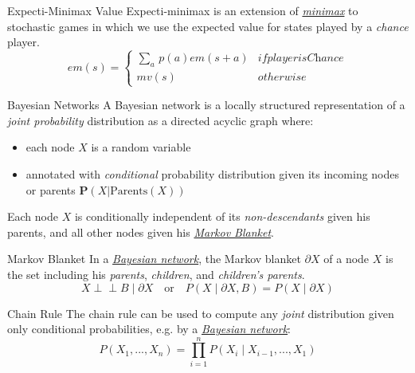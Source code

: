 \documentclass{cognito}
\begin{document}

\begin{note}{Expecti-Minimax Value}
	Expecti-minimax is an extension of \hyperref[note:Minimax Decision]{\it minimax} to stochastic games in which
	we use the expected value for states played by a \emph{chance} player.
	$$
		em(s) = \begin{cases*}
			\sum_a \, p(a) em(s + a) & if player is \textit{Chance}\\
			mv(s) & otherwise
		\end{cases*}
	$$
	\vspace{-5pt}
\end{note}

\begin{note}{Bayesian Networks}
	A Bayesian network is a locally structured representation of a \emph{joint probability} distribution
	as a directed acyclic graph where:\begin{itemize}
		\item each node $X$ is a random variable
		\item annotated with \emph{conditional} probability distribution given its incoming nodes or parents $\mathbf{P}(X|\text{Parents}(X))$
	\end{itemize}
	Each node $X$ is conditionally independent of its \emph{non-descendants} given his parents, and all other nodes
	given his \hyperref[note:Markov Blanket]{\emph{Markov Blanket}}.
	
\end{note}

\begin{note}{Markov Blanket}
	In a \hyperref[note:Bayesian Networks]{\emph{Bayesian network}}, the Markov blanket $\partial X$ of a node $X$ is the set including his \emph{parents}, \emph{children}, and \emph{children's parents}.
	$$
		X \perp \!\!\!\! \perp B \mid \partial X \quad \text{or} \quad P(X \mid \partial X, B) = P(X \mid \partial X)
	$$
	\vspace{-10pt}
\end{note}

\begin{note}{Chain Rule}
	The chain rule can be used to compute any \emph{joint} distribution given only conditional probabilities,
	e.g. by a \hyperref[note:Bayesian Networks]{\it Bayesian network}:
	$$
		P( X_1,..., X_n) = \prod_{i=1}^n P(X_i \mid X_{i-1}, ..., X_1)
	$$
	\vspace{-10pt}
\end{note}
\end{document}
